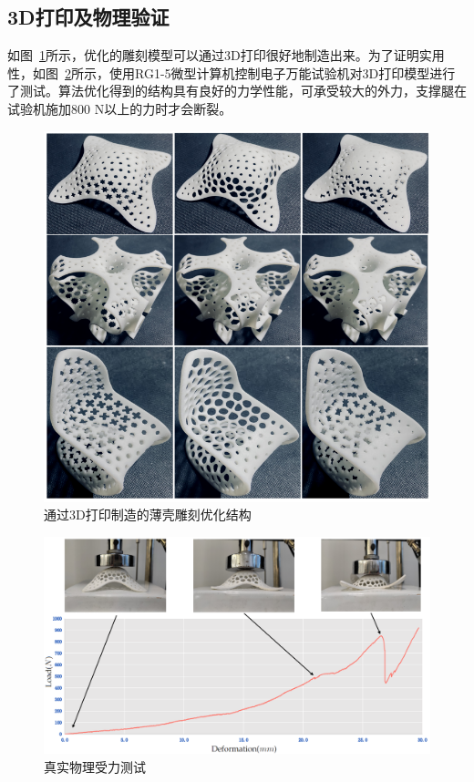 \subsection{3D打印及物理验证}
如图~\ref{fig-printing}所示，优化的雕刻模型可以通过3D打印很好地制造出来。为了证明实用性，如图~\ref{fig-physical_validation}所示，使用RG1-5微型计算机控制电子万能试验机对3D打印模型进行了测试。算法优化得到的结构具有良好的力学性能，可承受较大的外力，支撑腿在试验机施加800 N以上的力时才会断裂。
\begin{figure}[htbp]
    \begin{center}
        \includegraphics[width=0.9\linewidth]{./figures/fig-printing.png}
    \end{center}
    \caption{通过3D打印制造的薄壳雕刻优化结构}
    \label{fig-printing}
\end{figure}
\begin{figure}[htbp]
	\begin{center}
		\includegraphics[width=1\linewidth]{./figures/fig-Physical_validation.png}
	\end{center}
	\caption{真实物理受力测试}
	\label{fig-physical_validation}
\end{figure}



